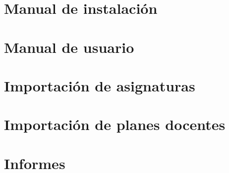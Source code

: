 \documentclass[a4paper,11pt]{book}
\begin{document}
\chapter{Manual de instalación}

\chapter{Manual de usuario}

\chapter{Importación de asignaturas}

\chapter{Importación de planes docentes}

\chapter{Informes}

\clearpage
{}


%

%


\end{document}

